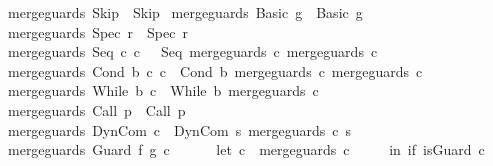 \begin{isabellebody}
\isanewline
{\isachardoublequoteopen}merge{\isacharunderscore}guards\ Skip\ {\isacharequal}\ Skip{\isachardoublequoteclose}\ {\isacharbar}\isanewline
{\isachardoublequoteopen}merge{\isacharunderscore}guards\ {\isacharparenleft}Basic\ g{\isacharparenright}\ {\isacharequal}\ Basic\ g{\isachardoublequoteclose}\ {\isacharbar}\isanewline
{\isachardoublequoteopen}merge{\isacharunderscore}guards\ {\isacharparenleft}Spec\ r{\isacharparenright}\ {\isacharequal}\ Spec\ r{\isachardoublequoteclose}\ {\isacharbar}\isanewline
{\isachardoublequoteopen}merge{\isacharunderscore}guards\ {\isacharparenleft}Seq\ c\ c\ \ {\isacharequal}\ {\isacharparenleft}Seq\ {\isacharparenleft}merge{\isacharunderscore}guards\ c\ {\isacharparenleft}merge{\isacharunderscore}guards\ c\ {\isacharbar}\isanewline
{\isachardoublequoteopen}merge{\isacharunderscore}guards\ {\isacharparenleft}Cond\ b\ c\ c\ {\isacharequal}\ Cond\ b\ {\isacharparenleft}merge{\isacharunderscore}guards\ c\ {\isacharparenleft}merge{\isacharunderscore}guards\ c\ {\isacharbar}\isanewline
{\isachardoublequoteopen}merge{\isacharunderscore}guards\ {\isacharparenleft}While\ b\ c{\isacharparenright}\ {\isacharequal}\ While\ b\ {\isacharparenleft}merge{\isacharunderscore}guards\ c{\isacharparenright}{\isachardoublequoteclose}\ {\isacharbar}\isanewline
{\isachardoublequoteopen}merge{\isacharunderscore}guards\ {\isacharparenleft}Call\ p{\isacharparenright}\ {\isacharequal}\ Call\ p{\isachardoublequoteclose}\ {\isacharbar}\isanewline
{\isachardoublequoteopen}merge{\isacharunderscore}guards\ {\isacharparenleft}DynCom\ c{\isacharparenright}\ {\isacharequal}\ DynCom\ {\isacharparenleft}{\isasymlambda}s{\isachardot}\ {\isacharparenleft}merge{\isacharunderscore}guards\ {\isacharparenleft}c\ s{\isacharparenright}{\isacharparenright}{\isacharparenright}{\isachardoublequoteclose}\ {\isacharbar}\isanewline
\isanewline
\isanewline
{\isachardoublequoteopen}merge{\isacharunderscore}guards\ {\isacharparenleft}Guard\ f\ g\ c{\isacharparenright}\ {\isacharequal}\ \isanewline
\ \ \ \ {\isacharparenleft}let\ c{\isacharprime}\ {\isacharequal}\ {\isacharparenleft}merge{\isacharunderscore}guards\ c{\isacharparenright}\isanewline
\ \ \ \ \ in\ if\ is{\isacharunderscore}Guard\ c{\isacharprime}\ \isanewline

\end{isabellebody}
